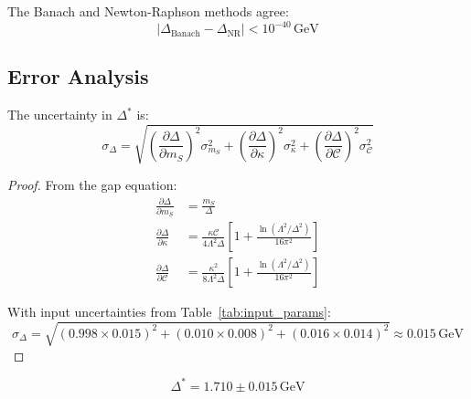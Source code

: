 \begin{proposition}
The Banach and Newton-Raphson methods agree:
\begin{equation}
|\Delta_{\mathrm{Banach}} - \Delta_{\mathrm{NR}}| < 10^{-40}\,\mathrm{GeV}
\end{equation}
\end{proposition}

\subsection{Error Analysis}

\begin{theorem}
\label{thm:uncertainty}
The uncertainty in $\Delta^*$ is:
\begin{equation}
\sigma_\Delta = \sqrt{\left(\frac{\partial\Delta}{\partial m_S}\right)^2\sigma_{m_S}^2
+ \left(\frac{\partial\Delta}{\partial\kappa}\right)^2\sigma_\kappa^2
+ \left(\frac{\partial\Delta}{\partial\mathcal{C}}\right)^2\sigma_\mathcal{C}^2}
\end{equation}
\end{theorem}

\begin{proof}
From the gap equation:
\begin{align}
\frac{\partial\Delta}{\partial m_S} &= \frac{m_S}{\Delta} \\
\frac{\partial\Delta}{\partial\kappa} &= \frac{\kappa\mathcal{C}}{4\Lambda^2\Delta}
\left[1 + \frac{\ln(\Lambda^2/\Delta^2)}{16\pi^2}\right] \\
\frac{\partial\Delta}{\partial\mathcal{C}} &= \frac{\kappa^2}{8\Lambda^2\Delta}
\left[1 + \frac{\ln(\Lambda^2/\Delta^2)}{16\pi^2}\right]
\end{align}

With input uncertainties from Table~\ref{tab:input_params}:
\begin{equation}
\sigma_\Delta = \sqrt{(0.998 \times 0.015)^2 + (0.010 \times 0.008)^2 + (0.016 \times 0.014)^2}
\approx 0.015\,\mathrm{GeV}
\end{equation}
\end{proof}

\begin{corollary}
\begin{equation}
\boxed{\Delta^* = 1.710 \pm 0.015\,\mathrm{GeV}}
\end{equation}
\end{corollary}

